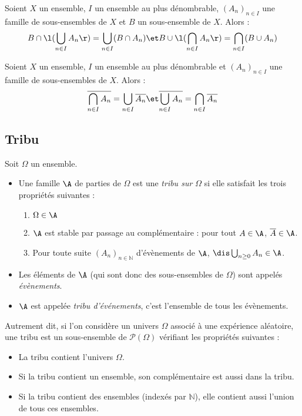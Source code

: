 \documentclass[a4paper,10pt]{report}
\begin{document}
\begin{prop}[Distributivité]
Soient  $X$ un ensemble, $I$ un ensemble au plus dénombrable, $(A_n)_{n\in I}$ une famille de sous-ensembles de $X$ et $B$ un sous-ensemble de $X$. Alors :
 $$ B \cap \l(\bigcup_{n\in I} A_n \r) = \bigcup_{n\in I} (B \cap A_n) \et  B \cup \l(\bigcap_{n\in I} A_n \r) = \bigcap_{n\in I} (B \cup A_n) $$
\end{prop}


\begin{thm}
 Soient $X$ un ensemble, $I$ un ensemble au plus dénombrable et $(A_n)_{n\in I}$ une famille de sous-ensembles de $X$. Alors :
 $$ \overline{\bigcap_{n\in I} A_n} = \bigcup_{n\in I} \overline{A_n} \et \overline{\bigcup_{n\in I} A_n} = \bigcap_{n\in I} \overline{A_n}$$
\end{thm}


\subsection{Tribu}

\begin{defin}[Tribu]
Soit $\Omega $ un ensemble. 
\begin{itemize}
\item Une famille $\A$ de parties de $\Omega$ est une \textit{tribu sur $\Omega$} si elle satisfait les trois propriétés suivantes :
\begin{enumerate}
\item $\Omega \in\A$ 
\item $\A$ est stable par passage au complémentaire : pour tout $A \in\A$,  $\overline{A} \in \A$.
\item Pour toute suite $(A_n)_{n \in \mathbb{N}}$ d'évènements de $\A$, $\dis \bigcup_{n \geq 0} A_n \in \A$.
\end{enumerate}
\item Les éléments de $\A$ (qui sont donc des sous-ensembles de $\Omega$) sont appelés \textit{évènements}.
\item $\A$ est appelée \textit{tribu d'événements}, c'est l'ensemble de tous les évènements.
\end{itemize}
\end{defin}

\vspace{0.2cm}

\noindent Autrement dit, si l'on considère un univers $\Omega$ associé à une expérience aléatoire, une tribu est un sous-ensemble de $\mathcal{P}(\Omega)$ vérifiant les propriétés suivantes :
\begin{itemize}
\item La tribu contient l'univers $\Omega$.
\item Si la tribu contient un ensemble, son complémentaire est aussi dans la tribu.
\item Si la tribu contient des ensembles (indexés par $\mathbb{N}$), elle contient aussi l'union de tous ces ensembles.
\end{itemize}
\end{document}

